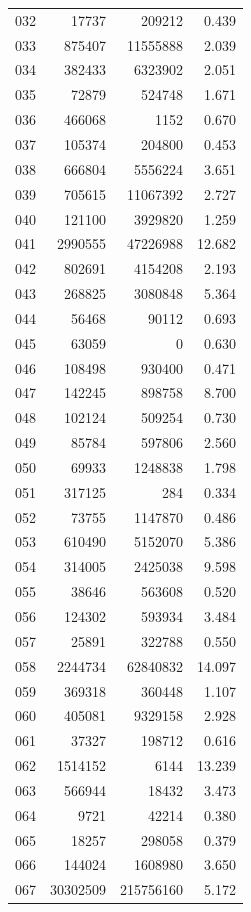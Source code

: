 \documentclass[anonymous,notoc]{gmcm2026}
\begin{document}
\begin{longtable}{lrrr}
032 & 17737 & 209212 & 0.439 \\
033 & 875407 & 11555888 & 2.039 \\
034 & 382433 & 6323902 & 2.051 \\
035 & 72879 & 524748 & 1.671 \\
036 & 466068 & 1152 & 0.670 \\
037 & 105374 & 204800 & 0.453 \\
038 & 666804 & 5556224 & 3.651 \\
039 & 705615 & 11067392 & 2.727 \\
040 & 121100 & 3929820 & 1.259 \\
041 & 2990555 & 47226988 & 12.682 \\
042 & 802691 & 4154208 & 2.193 \\
043 & 268825 & 3080848 & 5.364 \\
044 & 56468 & 90112 & 0.693 \\
045 & 63059 & 0 & 0.630 \\
046 & 108498 & 930400 & 0.471 \\
047 & 142245 & 898758 & 8.700 \\
048 & 102124 & 509254 & 0.730 \\
049 & 85784 & 597806 & 2.560 \\
050 & 69933 & 1248838 & 1.798 \\
051 & 317125 & 284 & 0.334 \\
052 & 73755 & 1147870 & 0.486 \\
053 & 610490 & 5152070 & 5.386 \\
054 & 314005 & 2425038 & 9.598 \\
055 & 38646 & 563608 & 0.520 \\
056 & 124302 & 593934 & 3.484 \\
057 & 25891 & 322788 & 0.550 \\
058 & 2244734 & 62840832 & 14.097 \\
059 & 369318 & 360448 & 1.107 \\
060 & 405081 & 9329158 & 2.928 \\
061 & 37327 & 198712 & 0.616 \\
062 & 1514152 & 6144 & 13.239 \\
063 & 566944 & 18432 & 3.473 \\
064 & 9721 & 42214 & 0.380 \\
065 & 18257 & 298058 & 0.379 \\
066 & 144024 & 1608980 & 3.650 \\
067 & 30302509 & 215756160 & 5.172 \\

\end{longtable}
\end{document}
